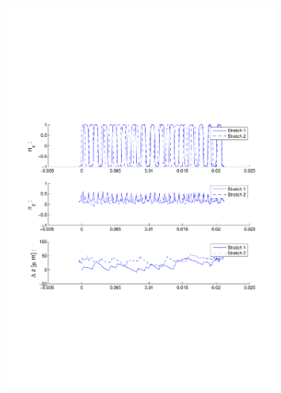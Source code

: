 \begin{figure}[ H]

\centering

\includegraphics[width=0.8\textwidth]{Images/Particle 18/Stretch1.pdf}

\end{figure}

